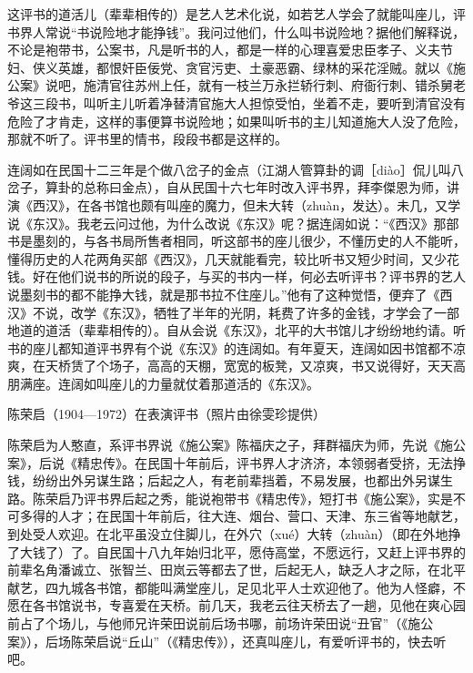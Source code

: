 \documentclass[12pt,UTF8]{ctexbook}
\begin{document}
这评书的道活儿（辈辈相传的）是艺人艺术化说，如若艺人学会了就能叫座儿，评书界人常说“书说险地才能挣钱”。我问过他们，什么叫书说险地？据他们解释说，不论是袍带书，公案书，凡是听书的人，都是一样的心理喜爱忠臣孝子、义夫节妇、侠义英雄，都恨奸臣佞党、贪官污吏、土豪恶霸、绿林的采花淫贼。就以《施公案》说吧，施清官往苏州上任，就有一枝兰万永拦轿行刺、府衙行刺、错杀舅老爷这三段书，叫听主儿听着净替清官施大人担惊受怕，坐着不走，要听到清官没有危险了才肯走，这样的事便算书说险地；如果叫听书的主儿知道施大人没了危险，那就不听了。评书里的情书，段段书都是这样的。

连阔如在民国十二三年是个做八岔子的金点（江湖人管算卦的调［diào］侃儿叫八岔子，算卦的总称曰金点），自从民国十六七年时改入评书界，拜李傑恩为师，讲演《西汉》，在各书馆也颇有叫座的魔力，但未大转（zhuàn，发达）。未几，又学说《东汉》。我老云问过他，为什么改说《东汉》呢？据连阔如说：“《西汉》那部书是墨刻的，与各书局所售者相同，听这部书的座儿很少，不懂历史的人不能听，懂得历史的人花两角买部《西汉》，几天就能看完，较比听书又短少时间，又少花钱。好在他们说书的所说的段子，与买的书内一样，何必去听评书？评书界的艺人说墨刻书的都不能挣大钱，就是那书拉不住座儿。”他有了这种觉悟，便弃了《西汉》不说，改学《东汉》，牺牲了半年的光阴，耗费了许多的金钱，才学会了一部地道的道活（辈辈相传的）。自从会说《东汉》，北平的大书馆儿才纷纷地约请。听书的座儿都知道评书界有个说《东汉》的连阔如。有年夏天，连阔如因书馆都不凉爽，在天桥赁了个场子，高高的天棚，宽宽的板凳，又凉爽，书又说得好，天天高朋满座。连阔如叫座儿的力量就仗着那道活的《东汉》。

陈荣启（1904—1972）在表演评书（照片由徐雯珍提供）



陈荣启为人憨直，系评书界说《施公案》陈福庆之子，拜群福庆为师，先说《施公案》，后说《精忠传》。在民国十年前后，评书界人才济济，本领弱者受挤，无法挣钱，纷纷出外另谋生路；后起之人，有老前辈挡着，不易发展，也都出外另谋生路。陈荣启乃评书界后起之秀，能说袍带书《精忠传》，短打书《施公案》，实是不可多得的人才；在民国十年前后，往大连、烟台、营口、天津、东三省等地献艺，到处受人欢迎。在北平虽没立住脚儿，在外穴（xué）大转（zhuàn）（即在外地挣了大钱了）了。自民国十八九年始归北平，愿侍高堂，不愿远行，又赶上评书界的前辈名角潘诚立、张智兰、田岚云等都去了世，后起无人，缺乏人才之际，在北平献艺，四九城各书馆，都能叫满堂座儿，足见北平人士欢迎他了。他为人怪癖，不愿在各书馆说书，专喜爱在天桥。前几天，我老云往天桥去了一趟，见他在爽心园前占了个场儿，与他师兄许荣田说前后场书哪，前场许荣田说“丑官”（《施公案》），后场陈荣启说“丘山”（《精忠传》），还真叫座儿，有爱听评书的，快去听吧。
\end{document}
